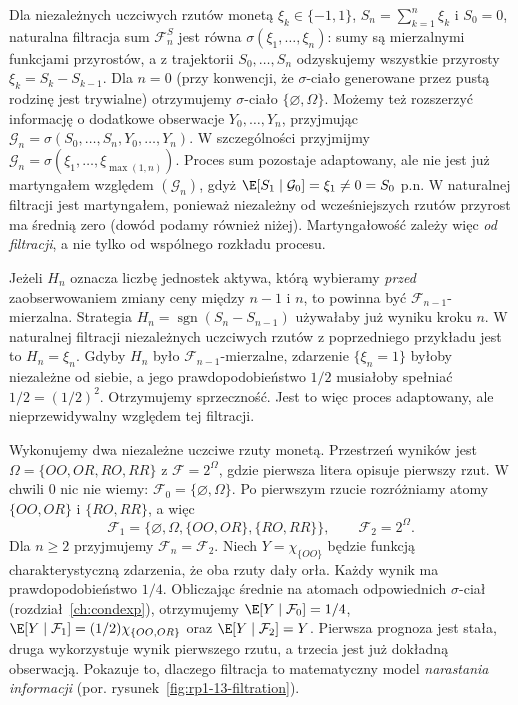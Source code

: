 \begin{przyklad}
Dla niezależnych uczciwych rzutów monetą
$\xi_k\in\{-1,1\}$,
$S_n=\sum_{k=1}^n\xi_k$ i $S_0=0$, naturalna
filtracja sum $\mathcal F_n^S$ jest równa
$\sigma(\xi_1,\ldots,\xi_n)$: sumy są mierzalnymi
funkcjami przyrostów, a z trajektorii $S_0,\ldots,S_n$
odzyskujemy wszystkie przyrosty $\xi_k=S_k-S_{k-1}$.
Dla $n=0$ (przy konwencji, że $\sigma$-ciało
generowane przez pustą rodzinę jest trywialne)
otrzymujemy $\sigma$-ciało
$\{\varnothing,\Omega\}$.
Możemy też rozszerzyć informację o dodatkowe
obserwacje $Y_0,\ldots,Y_n$, przyjmując
$\mathcal G_n=\sigma(S_0,\ldots,S_n,Y_0,\ldots,Y_n)$.
W szczególności przyjmijmy
$\mathcal G_n=\sigma(\xi_1,\ldots,\xi_{\max(1,n)})$.
Proces sum pozostaje adaptowany, ale nie jest już
martyngałem względem $(\mathcal G_n)$, gdyż
$\E[S_1\mid\mathcal G_0]=\xi_1\ne0=S_0$ p.n.
W naturalnej filtracji jest martyngałem, ponieważ
niezależny od wcześniejszych rzutów przyrost ma
średnią zero (dowód podamy również niżej). Martyngałowość
zależy więc \emph{od filtracji}, a nie tylko od
wspólnego rozkładu procesu.
\end{przyklad}

\begin{przyklad}
Jeżeli $H_n$ oznacza liczbę jednostek aktywa,
którą wybieramy \emph{przed} zaobserwowaniem
zmiany ceny między $n-1$ i $n$, to powinna być
$\mathcal F_{n-1}$-mierzalna. Strategia
$H_n=\operatorname{sgn}(S_n-S_{n-1})$ używałaby
już wyniku kroku $n$. W naturalnej filtracji
niezależnych uczciwych rzutów z poprzedniego przykładu
jest to $H_n=\xi_n$. Gdyby $H_n$ było
$\mathcal F_{n-1}$-mierzalne, zdarzenie $\{\xi_n=1\}$
byłoby niezależne od siebie, a jego prawdopodobieństwo
$1/2$ musiałoby spełniać $1/2=(1/2)^2$.
Otrzymujemy sprzeczność. Jest to więc proces adaptowany,
ale nieprzewidywalny względem tej filtracji.
\end{przyklad}


\begin{przyklad}
Wykonujemy dwa niezależne uczciwe rzuty monetą.
Przestrzeń wyników jest
$\Omega=\{OO,OR,RO,RR\}$ z $\mathcal F=2^\Omega$,
gdzie pierwsza litera
opisuje pierwszy rzut. W chwili $0$ nic nie wiemy:
$\mathcal F_0=\{\varnothing,\Omega\}$. Po pierwszym
rzucie rozróżniamy atomy $\{OO,OR\}$ i $\{RO,RR\}$,
a więc
\[
\mathcal F_1=\{\varnothing,\Omega,
\{OO,OR\},\{RO,RR\}\},\qquad
\mathcal F_2=2^\Omega.
\]
Dla $n\geq2$ przyjmujemy $\mathcal F_n=\mathcal F_2$.
Niech $Y=\chi_{\{OO\}}$ będzie funkcją
charakterystyczną zdarzenia, że oba rzuty dały orła.
Każdy wynik ma prawdopodobieństwo $1/4$.
Obliczając średnie na atomach odpowiednich
$\sigma$-ciał (rozdział~\ref{ch:condexp}), otrzymujemy
$\E[Y\mid\mathcal F_0]=1/4$,
$\E[Y\mid\mathcal F_1]=(1/2)\chi_{\{OO,OR\}}$
oraz $\E[Y\mid\mathcal F_2]=Y$.
Pierwsza prognoza jest stała, druga wykorzystuje wynik
pierwszego rzutu, a trzecia jest już dokładną
obserwacją. Pokazuje to, dlaczego filtracja
to matematyczny model \emph{narastania informacji}
(por. rysunek~\ref{fig:rp1-13-filtration}).
\end{przyklad}

